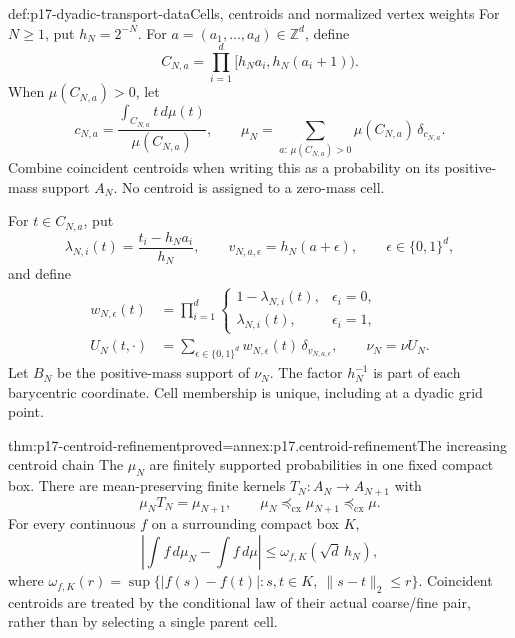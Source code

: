 \begin{hbdefinition}{def:p17-dyadic-transport-data}{Cells, centroids and normalized vertex weights}
For \(N\geq1\), put \(h_N=2^{-N}\). For
\(a=(a_1,\ldots,a_d)\in\mathbb Z^d\), define
\[
                 C_{N,a}=\prod_{i=1}^d[h_Na_i,h_N(a_i+1)).
\]
When \(\mu(C_{N,a})>0\), let
\[
      c_{N,a}=\frac{\int_{C_{N,a}}t\,d\mu(t)}{\mu(C_{N,a})},
      \qquad
      \mu_N=\sum_{a:\,\mu(C_{N,a})>0}
                                      \mu(C_{N,a})\,\delta_{c_{N,a}}.
\]
Combine coincident centroids when writing this as a probability on its
positive-mass support \(A_N\). No centroid is assigned to a zero-mass cell.

For \(t\in C_{N,a}\), put
\[
 \lambda_{N,i}(t)=\frac{t_i-h_Na_i}{h_N},\qquad
 v_{N,a,\epsilon}=h_N(a+\epsilon),\qquad
 \epsilon\in\{0,1\}^d,
\]
and define
\[
 \begin{split}
 w_{N,\epsilon}(t)
   &=\prod_{i=1}^d
       \begin{cases}
          1-\lambda_{N,i}(t),&\epsilon_i=0,\\
          \lambda_{N,i}(t),&\epsilon_i=1,
        \end{cases}\\
 U_N(t,\cdot)&=\sum_{\epsilon\in\{0,1\}^d}
                         w_{N,\epsilon}(t)\,\delta_{v_{N,a,\epsilon}},
 \qquad \nu_N=\nu U_N.
 \end{split}
\]
Let \(B_N\) be the positive-mass support of \(\nu_N\).
The factor \(h_N^{-1}\) is part of each barycentric coordinate.
Cell membership is unique, including at a dyadic grid point.
\end{hbdefinition}

\begin{hbtheorem}{thm:p17-centroid-refinement}{proved=annex:p17.centroid-refinement}{The increasing centroid chain}
The \(\mu_N\) are finitely supported probabilities in one fixed compact
box. There are mean-preserving finite kernels
\(T_N:A_N\to A_{N+1}\) with
\[
                 \mu_NT_N=\mu_{N+1},\qquad
                 \mu_N\preceq_{\mathrm{cx}}\mu_{N+1}
                         \preceq_{\mathrm{cx}}\mu.
\]
For every continuous \(f\) on a surrounding compact box \(K\),
\[
        \left|\int f\,d\mu_N-\int f\,d\mu\right|
                            \leq\omega_{f,K}(\sqrt d\,h_N),
\]
where
\(\omega_{f,K}(r)=\sup\{|f(s)-f(t)|:s,t\in K,\ \|s-t\|_2\leq r\}\).
Coincident centroids are treated by the conditional law of their
actual coarse/fine pair, rather than by selecting a single parent cell.
\end{hbtheorem}


